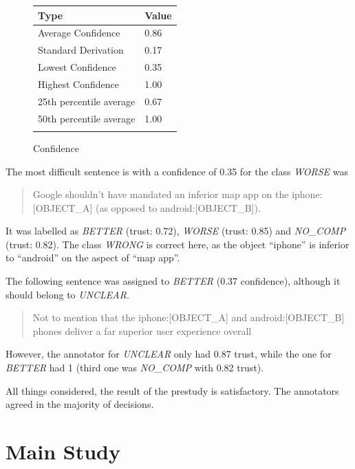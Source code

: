 \begin{figure}[h]
\centering
\caption{Confidence}
\begin{tabular}{@{}ll@{}}
\toprule
Type & Value  \\ \midrule
Average Confidence & 0.86 \\
Standard Derivation & 0.17 \\
Lowest Confidence & 0.35\\
Highest Confidence & 1.00\\
25th percentile average & 0.67\\
50th percentile average & 1.00\\
\bottomrule
\label{pre:conf-table}
\end{tabular}
\end{figure}





The most difficult sentence is with a confidence of 0.35 for the class \emph{WORSE} was
\begin{quote}
Google shouldn't have mandated an inferior map app on the iphone:[OBJECT\_A] (as opposed to android:[OBJECT\_B]).
\end{quote}

It was labelled as \emph{BETTER} (trust: 0.72), \emph{WORSE} (trust: 0.85) and \emph{NO\_COMP} (trust: 0.82). The class \emph{WRONG} is correct here, as the object \enquote{iphone} is inferior to \enquote{android} on the aspect of \enquote{map app}.

The following sentence was assigned to \emph{BETTER} (0.37 confidence), although it should belong to \emph{UNCLEAR}.
\begin{quote}
Not to mention that the iphone:[OBJECT\_A] and android:[OBJECT\_B] phones deliver a far superior user experience overall
\end{quote}
However, the annotator for \emph{UNCLEAR} only had 0.87 trust, while the one for \emph{BETTER} had 1 (third one was \emph{NO\_COMP} with 0.82 trust).\newline

All things considered, the result of the prestudy is satisfactory. The annotators agreed in the majority of decisions. 



\section{Main Study}
